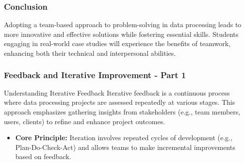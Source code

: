 \documentclass{beamer}
\begin{document}
\begin{frame}[fragile]
    \frametitle{Conclusion}
    Adopting a team-based approach to problem-solving in data processing leads to more innovative and effective solutions while fostering essential skills. Students engaging in real-world case studies will experience the benefits of teamwork, enhancing both their technical and interpersonal abilities.
\end{frame}

\begin{frame}[fragile]
    \frametitle{Feedback and Iterative Improvement - Part 1}
    \begin{block}{Understanding Iterative Feedback}
        Iterative feedback is a continuous process where data processing projects are assessed repeatedly at various stages. This approach emphasizes gathering insights from stakeholders (e.g., team members, users, clients) to refine and enhance project outcomes.
    \end{block}
    
    \begin{itemize}
        \item \textbf{Core Principle:} Iteration involves repeated cycles of development (e.g., Plan-Do-Check-Act) and allows teams to make incremental improvements based on feedback.
    \end{itemize}
\end{frame}
\end{document}
